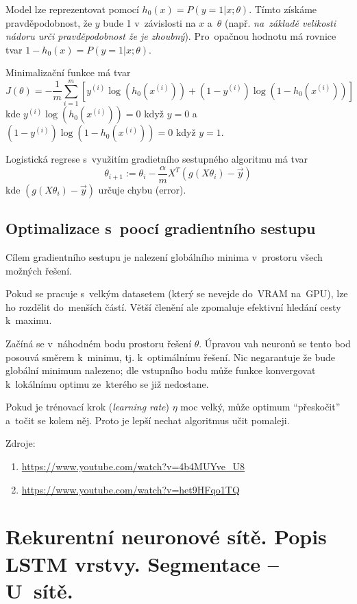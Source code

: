 Model lze reprezentovat pomocí $h_0(x) = P(y = 1 | x ; \theta)$.
Tímto získáme pravděpodobnost, že $y$ bude 1 v~závislosti na $x$ a~$\theta$
(např. \emph{na~základě velikosti nádoru urči pravděpodobnost že je zhoubný}).
Pro~opačnou hodnotu má rovnice tvar $1 - h_0(x) = P(y = 1 | x ; \theta)$.

Minimalizační funkce má tvar
$$
    J(\theta) = -\frac{1}{m} \sum_{i=1}^{m} \left[ y^{(i)}\log(h_0(x^{(i)})) + (1-y^{(i)})\log(1 - h_0(x^{(i)})) \right]
$$
kde $y^{(i)}\log(h_0(x^{(i)})) = 0$ když $y = 0$ a~$(1-y^{(i)})\log(1 - h_0(x^{(i)})) = 0$ když $y = 1$.

Logistická regrese s~využitím gradietního sestupného algoritmu má tvar
$$
    \theta_{i+1} := \theta_i - \frac{\alpha}{m} X^T(g(X\theta_i) - \vec{y})
$$
kde $(g(X\theta_i) - \vec{y})$ určuje chybu (error).

\subsection{Optimalizace s~poocí gradientního sestupu}

Cílem gradientního sestupu je nalezení globálního minima v~prostoru všech možných řešení.

Pokud se pracuje s~velkým datasetem (který se nevejde do~VRAM na~GPU), lze ho rozdělit do~menších částí.
Větší členění ale zpomaluje efektivní hledání cesty k~maximu.

Začíná se v~náhodném bodu prostoru řešení $\theta$.
Úpravou vah neuronů se tento bod posouvá směrem k~minimu, tj. k~optimálnímu řešení.
Nic negarantuje že bude globální minimum nalezeno; dle vstupního bodu může funkce konvergovat k~lokálnímu optimu ze~kterého se již nedostane.

Pokud je trénovací krok (\emph{learning rate}) $\eta$ moc velký, může optimum \enquote{přeskočit} a~točit se kolem něj. Proto je lepší nechat algoritmus učit pomaleji.

Zdroje:
\begin{enumerate}
    \item \url{https://www.youtube.com/watch?v=4b4MUYve_U8}
    \item \url{https://www.youtube.com/watch?v=het9HFqo1TQ}
\end{enumerate}

\clearpage
\section{Rekurentní neuronové sítě. Popis LSTM vrstvy. Segmentace -- U~sítě.}

